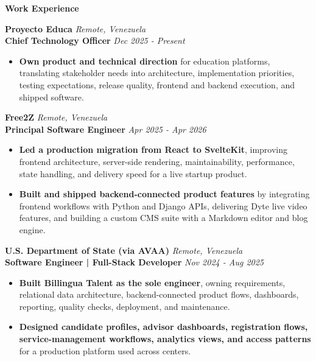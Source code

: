 \documentclass[10pt]{article}
\begin{document}
\vspace{4pt}
\begin{center}
    \textbf{Work Experience}
\end{center}
\vspace{-6pt}

\textbf{Proyecto Educa} \hfill \textit{Remote, Venezuela} \\
\textbf{Chief Technology Officer} \hfill \textit{Dec 2025 - Present}
\begin{itemize}
    \item \textbf{Own product and technical direction} for education platforms, translating stakeholder needs into architecture, implementation priorities, testing expectations, release quality, frontend and backend execution, and shipped software.
\end{itemize}

\vspace{3pt}
\textbf{Free2Z} \hfill \textit{Remote, Venezuela} \\
\textbf{Principal Software Engineer} \hfill \textit{Apr 2025 - Apr 2026}
\begin{itemize}
    \item \textbf{Led a production migration from React to SvelteKit}, improving frontend architecture, server-side rendering, maintainability, performance, state handling, and delivery speed for a live startup product.
    \item \textbf{Built and shipped backend-connected product features} by integrating frontend workflows with Python and Django APIs, delivering Dyte live video features, and building a custom CMS suite with a Markdown editor and blog engine.
\end{itemize}

\vspace{3pt}
\textbf{U.S. Department of State (via AVAA)} \hfill \textit{Remote, Venezuela} \\
\textbf{Software Engineer | Full-Stack Developer} \hfill \textit{Nov 2024 - Aug 2025}
\begin{itemize}
    \item \textbf{Built Billingua Talent as the sole engineer}, owning requirements, relational data architecture, backend-connected product flows, dashboards, reporting, quality checks, deployment, and maintenance.
    \item \textbf{Designed candidate profiles, advisor dashboards, registration flows, service-management workflows, analytics views, and access patterns} for a production platform used across centers.
\end{itemize}
\end{document}
